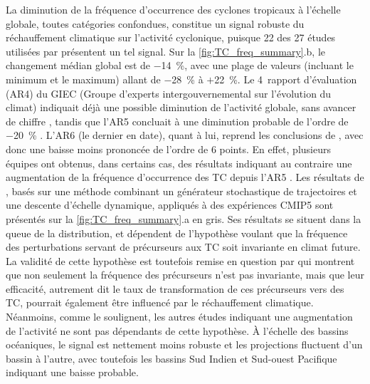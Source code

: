 \documentclass[../main.tex]{subfiles}
\begin{document}
La diminution de la fréquence d'occurrence des cyclones tropicaux à l'échelle globale, toutes catégories confondues, constitue un signal robuste du
réchauffement climatique sur l'activité cyclonique, puisque \num{22} des \num{27} études utilisées par \citeauthor{knutson_tropical_2020} présentent un tel
signal. Sur la \cref{fig:TC_freq_summary}.b, le changement médian global est de \SI{-14}{\percent}, avec une plage de valeurs (incluant le minimum et le
maximum) allant de \SI{-28}{\percent} à $+$\SI{22}{\percent}. Le \num{4}\ieme~rapport d'évaluation (AR4) du GIEC (Groupe d'experts intergouvernemental sur
l’évolution du climat) indiquait déjà une possible diminution de l'activité globale, sans avancer de chiffre \parencite{meehl_global_2007}, tandis que l'AR5
concluait à une diminution probable de l'ordre de \SI{-20}{\percent} \parencite{christensen_climate_2013}. L'AR6 (le dernier en date), quant à lui, reprend les
conclusions de \textcite{knutson_tropical_2020} \parencite{seneviratne_weather_2021}, avec donc une baisse moins prononcée de l'ordre de \num{6} points. En effet,
plusieurs équipes ont obtenus, dans certains cas, des résultats indiquant au contraire une augmentation de la fréquence d'occurrence des TC depuis l'AR5
\parencite{camargo_global_2013,emanuel_downscaling_2013,wehner_resolution_2015,bhatia_projected_2018}. Les résultats de \textcite{emanuel_downscaling_2013}, basés
sur une méthode combinant un générateur stochastique de trajectoires et une descente d'échelle dynamique, appliqués à des expériences CMIP5 sont présentés sur
la \cref{fig:TC_freq_summary}.a en gris. Ses résultats se situent dans la queue de la distribution, et dépendent de l'hypothèse voulant que la fréquence des
perturbations servant de précurseurs aux TC soit invariante en climat future. La validité de cette hypothèse est toutefois remise en question par
\textcite{vecchi_tropical_2019,yamada_evaluation_2021} qui montrent que non seulement la fréquence des précurseurs n'est pas invariante, mais que leur
efficacité, autrement dit le taux de transformation de ces précurseurs vers des TC, pourrait également être influencé par le réchauffement climatique.
Néanmoins, comme \textcite{knutson_tropical_2020} le soulignent, les autres études indiquant une augmentation de l'activité ne sont pas dépendants de cette
hypothèse. À l'échelle des bassins océaniques, le signal est nettement moins robuste et les projections fluctuent d'un bassin à l'autre, avec toutefois les
bassins Sud Indien et Sud-ouest Pacifique indiquant une baisse probable.
\end{document}
